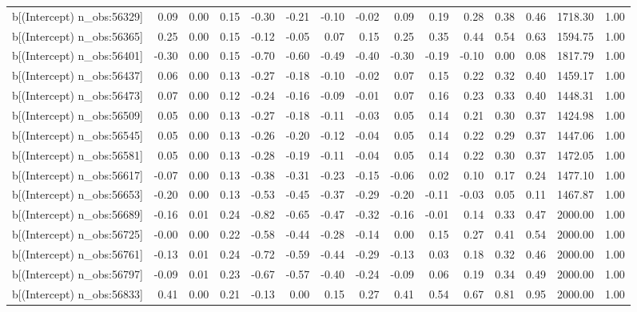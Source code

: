 \begin{table}[ht]
\begin{tabular}{rrrrrrrrrrrrrrr}
  b[(Intercept) n\_obs:56329] & 0.09 & 0.00 & 0.15 & -0.30 & -0.21 & -0.10 & -0.02 & 0.09 & 0.19 & 0.28 & 0.38 & 0.46 & 1718.30 & 1.00 \\ 
  b[(Intercept) n\_obs:56365] & 0.25 & 0.00 & 0.15 & -0.12 & -0.05 & 0.07 & 0.15 & 0.25 & 0.35 & 0.44 & 0.54 & 0.63 & 1594.75 & 1.00 \\ 
  b[(Intercept) n\_obs:56401] & -0.30 & 0.00 & 0.15 & -0.70 & -0.60 & -0.49 & -0.40 & -0.30 & -0.19 & -0.10 & 0.00 & 0.08 & 1817.79 & 1.00 \\ 
  b[(Intercept) n\_obs:56437] & 0.06 & 0.00 & 0.13 & -0.27 & -0.18 & -0.10 & -0.02 & 0.07 & 0.15 & 0.22 & 0.32 & 0.40 & 1459.17 & 1.00 \\ 
  b[(Intercept) n\_obs:56473] & 0.07 & 0.00 & 0.12 & -0.24 & -0.16 & -0.09 & -0.01 & 0.07 & 0.16 & 0.23 & 0.33 & 0.40 & 1448.31 & 1.00 \\ 
  b[(Intercept) n\_obs:56509] & 0.05 & 0.00 & 0.13 & -0.27 & -0.18 & -0.11 & -0.03 & 0.05 & 0.14 & 0.21 & 0.30 & 0.37 & 1424.98 & 1.00 \\ 
  b[(Intercept) n\_obs:56545] & 0.05 & 0.00 & 0.13 & -0.26 & -0.20 & -0.12 & -0.04 & 0.05 & 0.14 & 0.22 & 0.29 & 0.37 & 1447.06 & 1.00 \\ 
  b[(Intercept) n\_obs:56581] & 0.05 & 0.00 & 0.13 & -0.28 & -0.19 & -0.11 & -0.04 & 0.05 & 0.14 & 0.22 & 0.30 & 0.37 & 1472.05 & 1.00 \\ 
  b[(Intercept) n\_obs:56617] & -0.07 & 0.00 & 0.13 & -0.38 & -0.31 & -0.23 & -0.15 & -0.06 & 0.02 & 0.10 & 0.17 & 0.24 & 1477.10 & 1.00 \\ 
  b[(Intercept) n\_obs:56653] & -0.20 & 0.00 & 0.13 & -0.53 & -0.45 & -0.37 & -0.29 & -0.20 & -0.11 & -0.03 & 0.05 & 0.11 & 1467.87 & 1.00 \\ 
  b[(Intercept) n\_obs:56689] & -0.16 & 0.01 & 0.24 & -0.82 & -0.65 & -0.47 & -0.32 & -0.16 & -0.01 & 0.14 & 0.33 & 0.47 & 2000.00 & 1.00 \\ 
  b[(Intercept) n\_obs:56725] & -0.00 & 0.00 & 0.22 & -0.58 & -0.44 & -0.28 & -0.14 & 0.00 & 0.15 & 0.27 & 0.41 & 0.54 & 2000.00 & 1.00 \\ 
  b[(Intercept) n\_obs:56761] & -0.13 & 0.01 & 0.24 & -0.72 & -0.59 & -0.44 & -0.29 & -0.13 & 0.03 & 0.18 & 0.32 & 0.46 & 2000.00 & 1.00 \\ 
  b[(Intercept) n\_obs:56797] & -0.09 & 0.01 & 0.23 & -0.67 & -0.57 & -0.40 & -0.24 & -0.09 & 0.06 & 0.19 & 0.34 & 0.49 & 2000.00 & 1.00 \\ 
  b[(Intercept) n\_obs:56833] & 0.41 & 0.00 & 0.21 & -0.13 & 0.00 & 0.15 & 0.27 & 0.41 & 0.54 & 0.67 & 0.81 & 0.95 & 2000.00 & 1.00 \\ 

\end{tabular}
\end{table}
